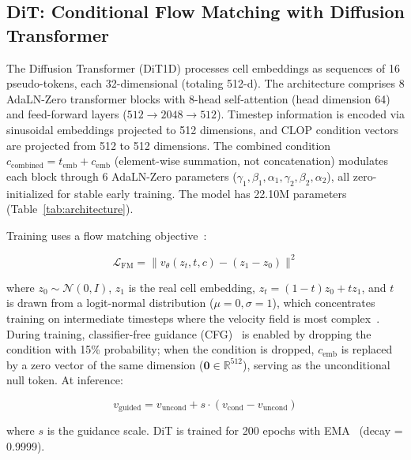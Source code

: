 \documentclass[genes,article,submit,pdftex,oneauthor]{Definitions/mdpi}
\begin{document}
\subsection{DiT: Conditional Flow Matching with Diffusion Transformer}\label{sec:dit}

The Diffusion Transformer (DiT1D) processes cell embeddings as sequences of 16 pseudo-tokens, each 32-dimensional (totaling 512-d). The architecture comprises 8 AdaLN-Zero transformer blocks with 8-head self-attention (head dimension 64) and feed-forward layers ($512 \to 2048 \to 512$). Timestep information is encoded via sinusoidal embeddings projected to 512 dimensions, and CLOP condition vectors are projected from 512 to 512 dimensions. The combined condition $c_\text{combined} = t_\text{emb} + c_\text{emb}$ (element-wise summation, not concatenation) modulates each block through 6 AdaLN-Zero parameters ($\gamma_1, \beta_1, \alpha_1, \gamma_2, \beta_2, \alpha_2$), all zero-initialized for stable early training. The model has 22.10M parameters (Table~\ref{tab:architecture}).

Training uses a flow matching objective~\cite{ref-flow-matching,ref-ot-cfm}:

\begin{linenomath}
\begin{equation}
\mathcal{L}_\text{FM} = \| v_\theta(z_t, t, c) - (z_1 - z_0) \|^2
\label{eq:fm}
\end{equation}
\end{linenomath}

where $z_0 \sim \mathcal{N}(0, I)$, $z_1$ is the real cell embedding, $z_t = (1-t)z_0 + tz_1$, and $t$ is drawn from a logit-normal distribution ($\mu{=}0, \sigma{=}1$), which concentrates training on intermediate timesteps where the velocity field is most complex~\cite{ref-sd3}. During training, classifier-free guidance (CFG)~\cite{ref-cfg} is enabled by dropping the condition with 15\% probability; when the condition is dropped, $c_\text{emb}$ is replaced by a zero vector of the same dimension ($\mathbf{0} \in \mathbb{R}^{512}$), serving as the unconditional null token. At inference:

\begin{linenomath}
\begin{equation}
v_\text{guided} = v_\text{uncond} + s \cdot (v_\text{cond} - v_\text{uncond})
\label{eq:cfg}
\end{equation}
\end{linenomath}

where $s$ is the guidance scale. DiT is trained for 200 epochs with EMA~\cite{ref-ema} (decay = 0.9999).
\end{document}
